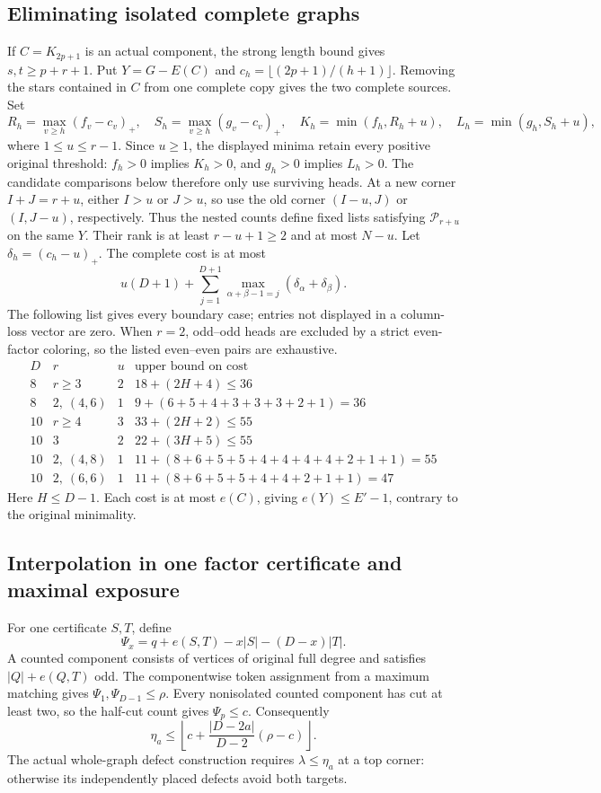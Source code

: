\documentclass[11pt,a4paper]{article}
\newcommand{\p}{\mathcal P}
\theoremstyle{definition}
\begin{document}
\subsection{Eliminating isolated complete graphs}
If $C=K_{2p+1}$ is an actual component, the strong length bound gives $s,t\ge p+r+1$. Put $Y=G-E(C)$ and $c_h=\lfloor(2p+1)/(h+1)\rfloor$. Removing the stars contained in $C$ from one complete copy gives the two complete sources. Set
\[
 R_h=\max_{v\ge h}(f_v-c_v)_+,\quad S_h=\max_{v\ge h}(g_v-c_v)_+,
\quad K_h=\min(f_h,R_h+u),\quad L_h=\min(g_h,S_h+u),
\]
where $1\le u\le r-1$. Since $u\ge1$, the displayed minima retain every positive original
threshold: $f_h>0$ implies $K_h>0$, and $g_h>0$ implies $L_h>0$.
The candidate comparisons below therefore only use surviving heads. At a new corner $I+J=r+u$, either $I>u$ or $J>u$, so use the old corner $(I-u,J)$ or $(I,J-u)$, respectively. Thus the nested counts define fixed lists satisfying $\p_{r+u}$ on the same $Y$. Their rank is at least $r-u+1\ge2$ and at most $N-u$.
Let $\delta_h=(c_h-u)_+$. The complete cost is at most
\[
 u(D+1)+\sum_{j=1}^{D+1}\max_{\alpha+\beta-1=j}(\delta_\alpha+\delta_\beta).
\]
The following list gives every boundary case; entries not displayed in a column-loss vector are zero. When $r=2$, odd--odd heads are excluded by a strict even-factor coloring, so the listed even--even pairs are exhaustive.
\[
\begin{array}{c|c|c|c}
 D&r&u&\text{upper bound on cost}\\ \hline
8&r\ge3&2&18+(2H+4)\le36\\
8&2,\ (4,6)&1&9+(6+5+4+3+3+3+2+1)=36\\
10&r\ge4&3&33+(2H+2)\le55\\
10&3&2&22+(3H+5)\le55\\
10&2,\ (4,8)&1&11+(8+6+5+5+4+4+4+4+2+1+1)=55\\
10&2,\ (6,6)&1&11+(8+6+5+5+4+4+2+1+1)=47
\end{array}
\]
Here $H\le D-1$. Each cost is at most $e(C)$, giving $e(Y)\le E'-1$, contrary to the original minimality.
\subsection{Interpolation in one factor certificate and maximal exposure}
For one certificate $S,T$, define
\[
 \Psi_x=q+e(S,T)-x|S|-(D-x)|T|.
\]
A counted component consists of vertices of original full degree and satisfies $|Q|+e(Q,T)$ odd. The componentwise token assignment from a maximum matching gives $\Psi_1,\Psi_{D-1}\le\rho$. Every nonisolated counted component has cut at least two, so the half-cut count gives $\Psi_p\le c$. Consequently
\begin{equation}\label{eq:even-interpolation}
 \eta_a\le\left\lfloor c+\frac{|D-2a|}{D-2}(\rho-c)\right\rfloor.
\end{equation}
The actual whole-graph defect construction requires $\lambda\le\eta_a$ at a top corner: otherwise its independently placed defects avoid both targets.
\end{document}
